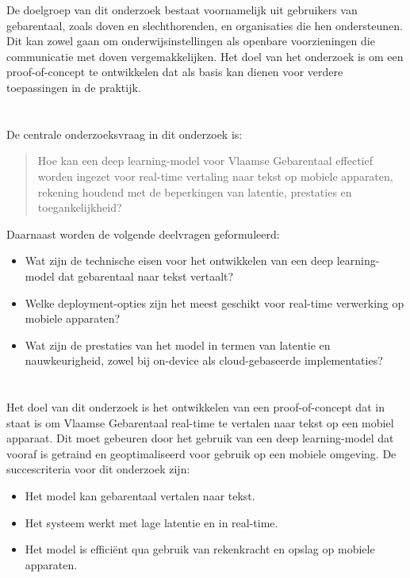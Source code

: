 De doelgroep van dit onderzoek bestaat voornamelijk uit gebruikers van gebarentaal, zoals doven en slechthorenden, en organisaties die hen ondersteunen. 
Dit kan zowel gaan om onderwijsinstellingen als openbare voorzieningen die communicatie met doven vergemakkelijken. 
Het doel van het onderzoek is om een proof-of-concept te ontwikkelen dat als basis kan dienen voor verdere toepassingen in de praktijk.

\section{}%
\label{sec:onderzoeksvraag}

De centrale onderzoeksvraag in dit onderzoek is:
\begin{quote}
    Hoe kan een deep learning-model voor Vlaamse Gebarentaal effectief worden ingezet voor real-time vertaling naar tekst op mobiele apparaten, rekening houdend met de beperkingen van latentie, prestaties en toegankelijkheid?
\end{quote}

Daarnaast worden de volgende deelvragen geformuleerd:
\begin{itemize}
  \item Wat zijn de technische eisen voor het ontwikkelen van een deep learning-model dat gebarentaal naar tekst vertaalt?
  \item Welke deployment-opties zijn het meest geschikt voor real-time verwerking op mobiele apparaten?
  \item Wat zijn de prestaties van het model in termen van latentie en nauwkeurigheid, zowel bij on-device als cloud-gebaseerde implementaties?
\end{itemize}

\section{}
\label{sec:onderzoeksdoelstelling}

Het doel van dit onderzoek is het ontwikkelen van een proof-of-concept dat in staat is om Vlaamse Gebarentaal real-time te vertalen naar tekst op een mobiel apparaat. 
Dit moet gebeuren door het gebruik van een deep learning-model dat vooraf is getraind en geoptimaliseerd voor gebruik op een mobiele omgeving. 
De succescriteria voor dit onderzoek zijn:
\begin{itemize}
  \item Het model kan gebarentaal vertalen naar tekst.
  \item Het systeem werkt met lage latentie en in real-time.
  \item Het model is efficiënt qua gebruik van rekenkracht en opslag op mobiele apparaten.
\end{itemize}

